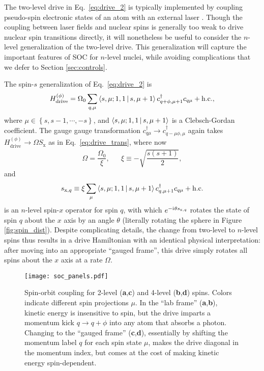 \documentclass[nofootinbib,twocolumn]{revtex4-2}
\renewcommand{\t}{\text} %
\newcommand{\f}[2]{\dfrac{#1}{#2}} %
\renewcommand{\set}[1]{\left\{#1\right\}} %
\newcommand{\bk}{\Braket} %
\renewcommand{\i}{\mathrm{i}\mkern1mu} %
\newcommand{\1}{\mathds{1}}
\newcommand{\x}{\text{x}}
\begin{document}
The two-level drive in Eq.~\eqref{eq:drive_2} is typically implemented by coupling pseudo-spin electronic states of an atom with an external laser \cite{wall2016synthetic, bromley2018dynamics}.
Though the coupling between laser fields and nuclear spins is generally too weak to drive nuclear spin transitions directly, it will nonetheless be useful to consider the $n$-level generalization of the two-level drive.
This generalization will capture the important features of SOC for $n$-level nuclei, while avoiding complications that we defer to Section \ref{sec:controls}.

The spin-$s$ generalization of Eq.~\eqref{eq:drive_2} is
\begin{align}
  H_{\t{drive}}^{(\phi)} = \Omega_0 \sum_{q,\mu} \bk{s,\mu;1,1|s,\mu+1}
  c_{q+\phi,\mu+1}^\dag c_{q\mu} + \t{h.c.},
\end{align}
where $\mu\in\set{s,s-1,\cdots,-s}$, and $\bk{s,\mu;1,1|s,\mu+1}$ is a Clebsch-Gordan coefficient.
The gauge gauge transformation $c_{q\mu}^\dag\to c_{q-\mu\phi,\mu}^\dag$ again takes $H_{\t{drive}}^{(\phi)}\to \Omega S_\x$ as in Eq.~\eqref{eq:drive_trans}, where now
\begin{align}
  \Omega = \f{\Omega_0}{\xi},
  &&
  \xi \equiv -\sqrt{\f{s(s+1)}{2}},
\end{align}
and
\begin{align}
  s_{\x,q} \equiv \xi \sum_\mu \bk{s,\mu;1,1|s,\mu+1} c_{q,\mu+1}^\dag c_{q\mu} + \t{h.c.}
  \label{eq:spin_x_op}
\end{align}
is an $n$-level spin-$x$ operator for spin $q$, with which $e^{-\i\theta s_{\x,q}}$ rotates the state of spin $q$ about the $x$ axis by an angle $\theta$ (literally rotating the sphere in Figure \ref{fig:spin_dist}).
Despite complicating details, the change from two-level to $n$-level spins thus results in a drive Hamiltonian with an identical physical interpretation: after moving into an appropriate ``gauged frame'', this drive simply rotates all spins about the $x$ axis at a rate $\Omega$.

\begin{figure}
\centering
\texttt{[image: soc\_panels.pdf]}
\caption{
Spin-orbit coupling for 2-level ({\bf a},{\bf c}) and 4-level ({\bf b},{\bf d}) spins.
Colors indicate different spin projections $\mu$.
In the ``lab frame'' ({\bf a},{\bf b}), kinetic energy is insensitive to spin, but the drive imparts a momentum kick $q\to q+\phi$ into any atom that absorbs a photon.
Changing to the ``gauged frame'' ({\bf c},{\bf d}), essentially by shifting the momentum label $q$ for each spin state $\mu$, makes the drive diagonal in the momentum index, but comes at the cost of making kinetic energy spin-dependent.
}
\label{fig:soc_panels}
\end{figure}
\end{document}
